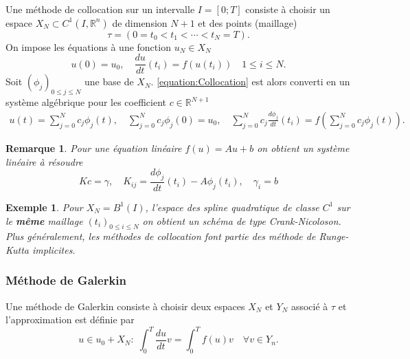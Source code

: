 \documentclass[11pt,a4paper, french]{article}
\newcommand{\R}{\mathbb R}
\newtheorem{remark}[theorem]{Remarque}
\newtheorem{example}[theorem]{Exemple}
\begin{document}
Une méthode de collocation sur un intervalle $I=[0;T]$ consiste à choisir un espace $X_N\subset C^1(I,\R^n)$ de dimension $N+1$ et des points (maillage)
%
\begin{equation}\label{equation:Mesh}
\tau = \left( 0 = t_0 < t_1 < \cdots < t_N = T\right).
\end{equation}
%
On impose les équations à une fonction $u_N\in X_N$
%
\begin{equation}\label{equation:Collocation}
u(0) = u_0,\quad \frac{du}{dt}(t_i) = f(u(t_i))\quad 1\le i\le N.
\end{equation}
%
Soit $(\phi_j)_{0\le j\le N}$ une base de $X_N$. \eqref{equation:Collocation} est alors converti en un système algébrique pour les coefficient $c\in\R^{N+1}$
\begin{align*}
u(t) = \sum_{j=0}^N c_j \phi_j(t),\quad \sum_{j=0}^N c_j \phi_j(0) = u_0,\quad \sum_{j=0}^N c_j\frac{d\phi_j}{dt}(t_i) = f(\sum_{j=0}^N c_j \phi_j(t)).
\end{align*}
%
%
\begin{remark}\label{remark:}
Pour une équation linéaire $f(u)=A u + b$ on obtient un système linéaire à résoudre
%
\begin{equation}\label{equation:}
K c = \gamma,\quad K_{ij} = \frac{d\phi_j}{dt}(t_i) - A\phi_j(t_i),\quad \gamma_i = b 
\end{equation}
%
\end{remark}
%
%
\begin{example}\label{example:}
Pour $X_N = B^1(I)$, l'espace des spline quadratique de classe $C^1$ sur le \textbf{même} maillage $(t_i)_{0\le i\le N}$ on obtient un schéma de type Crank-Nicoloson. Plus généralement, les méthodes de collocation font partie des méthode de Runge-Kutta implicites.
\end{example}
%
%
\subsubsection{Méthode de Galerkin}
%
Une méthode de Galerkin consiste à choisir deux espaces $X_N$ et $Y_N$ associé à $\tau$ et l'approximation est définie par
%
\begin{equation}\label{equation:}
u\in u_0+X_N :\;\int_0^T \frac{du}{dt} v =  \int_0^T f(u) v\quad \forall v\in Y_n.
\end{equation}
%
%
\end{document}
